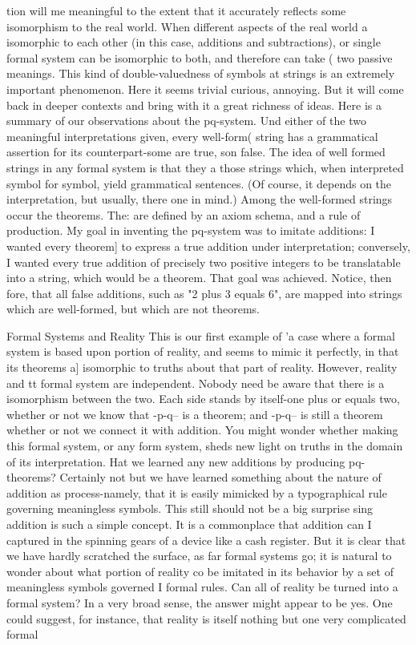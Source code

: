 tion will me meaningful to the extent that it accurately reflects some isomorphism to the
real world. When different aspects of the real world a isomorphic to each other (in this
case, additions and subtractions), or single formal system can be isomorphic to both, and
therefore can take ( two passive meanings. This kind of double-valuedness of symbols at
strings is an extremely important phenomenon. Here it seems trivial curious, annoying.
But it will come back in deeper contexts and bring with it a great richness of ideas.
        Here is a summary of our observations about the pq-system. Und either of the two
meaningful interpretations given, every well-form( string has a grammatical assertion for
its counterpart-some are true, son false. The idea of well formed strings in any formal
system is that they a those strings which, when interpreted symbol for symbol, yield
grammatical sentences. (Of course, it depends on the interpretation, but usually, there one
in mind.) Among the well-formed strings occur the theorems. The: are defined by an
axiom schema, and a rule of production. My goal in inventing the pq-system was to
imitate additions: I wanted every theorem] to express a true addition under interpretation;
conversely, I wanted every true addition of precisely two positive integers to be
translatable into a string, which would be a theorem. That goal was achieved. Notice,
then fore, that all false additions, such as "2 plus 3 equals 6", are mapped into strings
which are well-formed, but which are not theorems.


                            Formal Systems and Reality
This is our first example of 'a case where a formal system is based upon portion of
reality, and seems to mimic it perfectly, in that its theorems a] isomorphic to truths about
that part of reality. However, reality and tt formal system are independent. Nobody need
be aware that there is a isomorphism between the two. Each side stands by itself-one plus
or equals two, whether or not we know that -p-q-- is a theorem; and -p-q-- is still a
theorem whether or not we connect it with addition.
         You might wonder whether making this formal system, or any form system, sheds
new light on truths in the domain of its interpretation. Hat we learned any new additions
by producing pq-theorems? Certainly not but we have learned something about the nature
of addition as process-namely, that it is easily mimicked by a typographical rule
governing meaningless symbols. This still should not be a big surprise sing addition is
such a simple concept. It is a commonplace that addition can I captured in the spinning
gears of a device like a cash register.
         But it is clear that we have hardly scratched the surface, as far formal systems go;
it is natural to wonder about what portion of reality co be imitated in its behavior by a set
of meaningless symbols governed I formal rules. Can all of reality be turned into a formal
system? In a very broad sense, the answer might appear to be yes. One could suggest, for
instance, that reality is itself nothing but one very complicated formal




